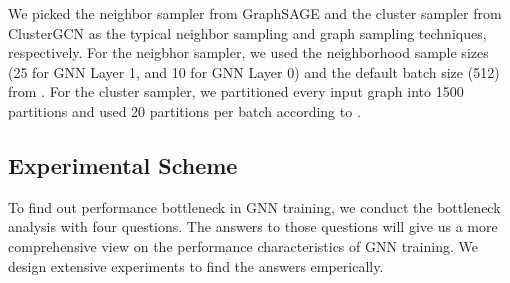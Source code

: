 We picked the neighbor sampler from GraphSAGE \cite{hamilton2017_graphsage} and the cluster sampler from ClusterGCN \cite{chiang2019_cluster_gcn} as the typical neighbor sampling and graph sampling techniques, respectively.
For the neigbhor sampler, we used the neighborhood sample sizes (25 for GNN Layer 1, and 10 for GNN Layer 0) and the default batch size (512) from \cite{hamilton2017_graphsage}.
For the cluster sampler, we partitioned every input graph into 1500 partitions and used 20 partitions per batch according to \cite{chiang2019_cluster_gcn}.

\subsection{Experimental Scheme}
\label{sec:experimental_scheme}

To find out performance bottleneck in GNN training, we conduct the bottleneck analysis with four questions.
The answers to those questions will give us a more comprehensive view on the performance characteristics of GNN training.
We design extensive experiments to find the answers emperically.
